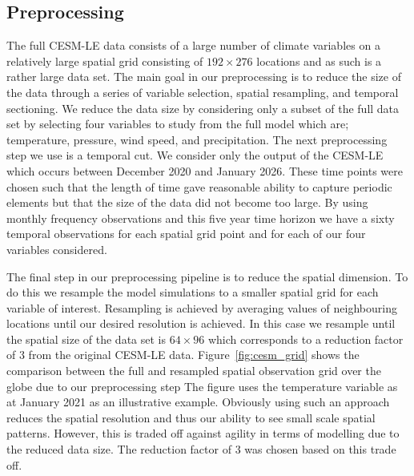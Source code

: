  \subsection{Preprocessing \label{sec:preprocessing}}
 The full CESM-LE data consists of a large number of climate variables on a relatively large spatial grid consisting of $192 \times 276$ locations and as such is a rather large data set. 
 The main goal in our preprocessing is to reduce the size of the data through a series of variable selection, spatial resampling, and temporal sectioning.
 We reduce the data size by considering only a subset of the full data set by selecting four variables to study from the full model which are; temperature, pressure, wind speed, and precipitation. 
 The next preprocessing step we use is a temporal cut.
 We consider only the output of the CESM-LE which occurs between December 2020 and January 2026. 
 These time points were chosen such that the length of time gave reasonable ability to capture periodic elements but that the size of the data did not become too large.
 By using monthly frequency observations and this five year time horizon we have a sixty temporal observations for each spatial grid point and for each of our four variables considered. 
 
 The final step in our preprocessing pipeline is to reduce the spatial dimension.
 To do this we resample the model simulations to a smaller spatial grid for each variable of interest.
 Resampling is achieved by averaging values of neighbouring locations until our desired resolution is achieved.
 In this case we resample until the spatial size of the data set is $64 \times 96$ which corresponds to a reduction factor of $3$ from the original CESM-LE data.
 Figure~\ref{fig:cesm_grid} shows the comparison between the full and resampled spatial observation grid over the globe due to our preprocessing step
 The figure uses the temperature variable as at January 2021 as an illustrative example. 
 Obviously using such an approach reduces the spatial resolution and thus our ability to see small scale spatial patterns.
 However, this is traded off against agility in terms of modelling due to the reduced data size.
 The reduction factor of $3$ was chosen based on this trade off.
 
